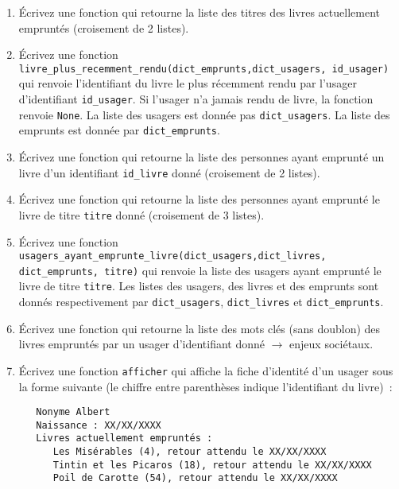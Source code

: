 \documentclass[10pt,a4paper]{sujets-exercices}
\begin{document}
\begin{enumerate}

\item Écrivez une fonction qui retourne la liste des titres des livres actuellement empruntés (croisement de 2 listes).

\item Écrivez une fonction \texttt{livre\_plus\_recemment\_rendu(dict\_emprunts,dict\_usagers, id\_usager)} qui renvoie l'identifiant du livre le plus récemment rendu par l'usager d'identifiant \texttt{id\_usager}. Si l'usager n'a jamais rendu de livre, la fonction renvoie \texttt{None}. La liste des usagers est donnée pas \texttt{dict\_usagers}. La liste des emprunts est donnée par \texttt{dict\_emprunts}.

\item Écrivez une fonction qui retourne la liste des personnes ayant emprunté un livre d'un identifiant \texttt{id\_livre} donné (croisement de 2 listes).

\item Écrivez une fonction qui retourne la liste des personnes ayant emprunté le livre de titre \texttt{titre} donné (croisement de 3 listes).

\item Écrivez une fonction \texttt{usagers\_ayant\_emprunte\_livre(dict\_usagers,dict\_livres,\\ dict\_emprunts, titre)} qui renvoie la liste des usagers ayant emprunté le livre de titre \texttt{titre}. Les listes des usagers, des livres et des emprunts sont donnés respectivement par \texttt{dict\_usagers}, \texttt{dict\_livres} et \texttt{dict\_emprunts}.

\item Écrivez une fonction qui retourne la liste des mots clés (sans doublon) des livres empruntés par un usager d'identifiant donné $\rightarrow$ enjeux sociétaux.

\item Écrivez une fonction \texttt{afficher} qui affiche la fiche d'identité d'un usager sous la forme suivante (le chiffre entre parenthèses indique l'identifiant du livre)~:\\
\begin{verbatim}
   Nonyme Albert
   Naissance : XX/XX/XXXX
   Livres actuellement empruntés :
      Les Misérables (4), retour attendu le XX/XX/XXXX
      Tintin et les Picaros (18), retour attendu le XX/XX/XXXX
      Poil de Carotte (54), retour attendu le XX/XX/XXXX
\end{verbatim}

\end{enumerate}
\end{document}
